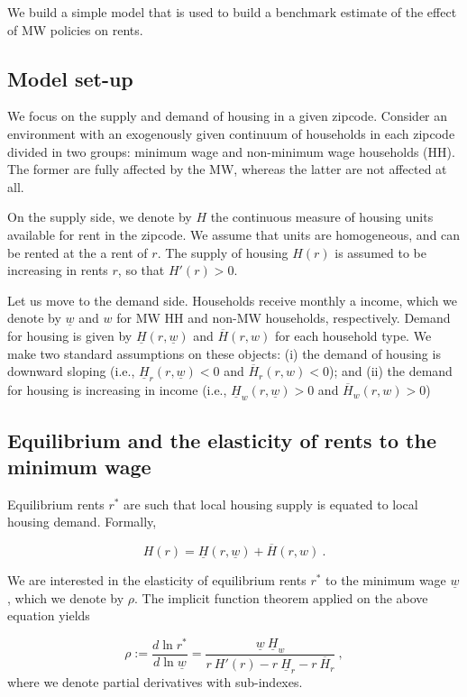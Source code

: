 We build a simple model that is used to build a benchmark estimate of the effect of MW
policies on rents.

\subsection{Model set-up}

We focus on the supply and demand of housing in a given zipcode. Consider an environment with 
an exogenously given continuum of households in each zipcode divided in two groups: minimum wage 
and non-minimum wage households (HH). The former are fully affected by the MW, whereas the latter 
are not affected at all.

On the supply side, we denote by $H$ the continuous measure of housing units available for rent 
in the zipcode. We assume that units are homogeneous, and can be rented at the a rent of $r$. The 
supply of housing $H(r)$ is assumed to be increasing in rents $r$, so that $H'(r) > 0$.

Let us move to the demand side. Households receive monthly a income, which we denote by 
$\underline{w}$ and $w$ for MW HH and non-MW households, respectively. Demand for housing is given 
by $\underline{H}(r, \underline{w})$ and $\overline{H}(r, w)$ for each household type. We make two 
standard assumptions on these objects: (i) the demand of housing is downward sloping (i.e., 
$\underline{H}_r(r, \underline{w}) < 0$ and $\overline{H}_r(r, w) < 0$); and (ii) the demand for 
housing is increasing in income (i.e., $\underline{H}_w(r, \underline{w}) > 0$ and $\overline{H}_w(r, 
w) > 0$)


\subsection{Equilibrium and the elasticity of rents to the minimum wage}

Equilibrium rents $r^*$ are such that local housing supply is equated to local housing demand. 
Formally,

\begin{equation*}\label{eq:model-eq}
H(r) =  \underline{H}(r, \underline{w}) + \overline{H}(r, w) \ .
\end{equation*}

We are interested in the elasticity of equilibrium rents $r^*$ to the minimum wage $\underline{w}$, 
which we denote by $\rho$. The implicit function theorem applied on the above equation yields

\begin{equation}\label{eq:model-elasticity}
\rho := \frac{d \ln r^*}{d \ln \underline{w}} 
= \frac{\underline{w} \ \underline{H}_w}
{r\  H'(r) - r \ \underline{H}_r - r \ \overline{H}_r} \ ,
\end{equation}
where we denote partial derivatives with sub-indexes.

